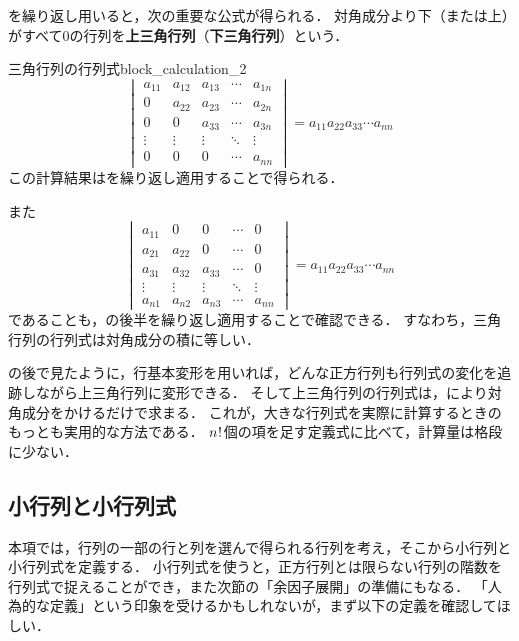 を繰り返し用いると，次の重要な公式が得られる．
対角成分より下（または上）がすべて$0$の行列を\textbf{上三角行列}（\textbf{下三角行列}）という．

\begin{example}{三角行列の行列式}{block_calculation_2}
  \[
  \begin{vmatrix} 
    a_{11} & a_{12} & a_{13} & \cdots & a_{1n} \\
    0      & a_{22} & a_{23} & \cdots & a_{2n} \\
    0      & 0      & a_{33} & \cdots & a_{3n} \\
    \vdots & \vdots & \vdots & \ddots & \vdots \\
    0      & 0      & 0      & \cdots & a_{nn}
  \end{vmatrix}
  =
  a_{11}a_{22}a_{33}\cdots a_{nn}
  \]
  この計算結果はを繰り返し適用することで得られる．

  また
  \[
  \begin{vmatrix}
  a_{11} & 0     & 0      & \cdots & 0      \\
  a_{21} & a_{22} & 0      & \cdots & 0      \\
  a_{31} & a_{32} & a_{33} & \cdots & 0      \\
  \vdots & \vdots & \vdots & \ddots & \vdots \\
  a_{n1} & a_{n2} & a_{n3} & \cdots & a_{nn}
  \end{vmatrix}
  = a_{11}a_{22}a_{33}\cdots a_{nn}
  \]
  であることも，の後半を繰り返し適用することで確認できる．
  すなわち，三角行列の行列式は対角成分の積に等しい．
\end{example}

の後で見たように，行基本変形を用いれば，どんな正方行列も行列式の変化を追跡しながら上三角行列に変形できる．
そして上三角行列の行列式は，により対角成分をかけるだけで求まる．
これが，大きな行列式を実際に計算するときのもっとも実用的な方法である．
$n\mkern1mu!\mkern1mu$個の項を足す定義式に比べて，計算量は格段に少ない．

\subsection{小行列と小行列式}

本項では，行列の一部の行と列を選んで得られる行列を考え，そこから小行列と小行列式を定義する．
小行列式を使うと，正方行列とは限らない行列の階数を行列式で捉えることができ，また次節の「余因子展開」の準備にもなる．
「人為的な定義」という印象を受けるかもしれないが，まず以下の定義を確認してほしい．

